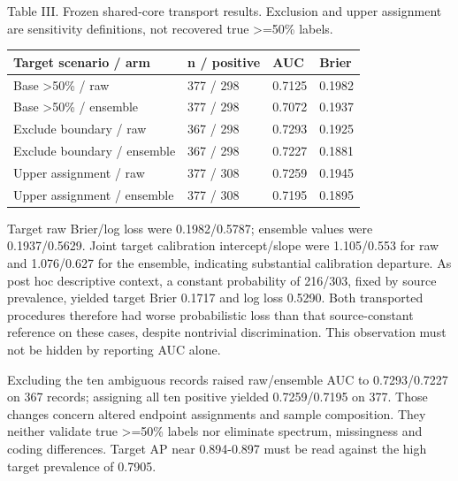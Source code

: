 \documentclass[conference,10pt]{IEEEtran}
\begin{document}
\begin{center}\begin{minipage}{\columnwidth}\centering\footnotesize
Table III. Frozen shared-core transport results. Exclusion and upper assignment are sensitivity definitions, not recovered true >=50\% labels.\par\vspace{3pt}
\setlength{\tabcolsep}{2.5pt}
\begin{tabular}{p{}p{}p{}p{}}
\toprule
Target scenario / arm & n / positive & AUC & Brier \\
\midrule
Base >50\% / raw & 377 / 298 & 0.7125 & 0.1982 \\
Base >50\% / ensemble & 377 / 298 & 0.7072 & 0.1937 \\
Exclude boundary / raw & 367 / 298 & 0.7293 & 0.1925 \\
Exclude boundary / ensemble & 367 / 298 & 0.7227 & 0.1881 \\
Upper assignment / raw & 377 / 308 & 0.7259 & 0.1945 \\
Upper assignment / ensemble & 377 / 308 & 0.7195 & 0.1895 \\
\bottomrule
\end{tabular}
\end{minipage}\end{center}
Target raw Brier/log loss were 0.1982/0.5787; ensemble values were 0.1937/0.5629. Joint target calibration intercept/slope were 1.105/0.553 for raw and 1.076/0.627 for the ensemble, indicating substantial calibration departure. As post hoc descriptive context, a constant probability of 216/303, fixed by source prevalence, yielded target Brier 0.1717 and log loss 0.5290. Both transported procedures therefore had worse probabilistic loss than that source-constant reference on these cases, despite nontrivial discrimination. This observation must not be hidden by reporting AUC alone.

Excluding the ten ambiguous records raised raw/ensemble AUC to 0.7293/0.7227 on 367 records; assigning all ten positive yielded 0.7259/0.7195 on 377. Those changes concern altered endpoint assignments and sample composition. They neither validate true >=50\% labels nor eliminate spectrum, missingness and coding differences. Target AP near 0.894-0.897 must be read against the high target prevalence of 0.7905.
\end{document}
